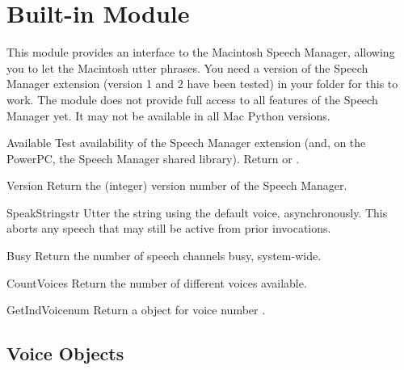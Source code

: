 \section{Built-in Module }




This module provides an interface to the Macintosh Speech Manager,
allowing you to let the Macintosh utter phrases. You need a version of
the Speech Manager extension (version 1 and 2 have been tested) in
your  folder for this to work. The module does not
provide full access to all features of the Speech Manager yet.  It may
not be available in all Mac Python versions.

\begin{funcdesc}{Available}{}
Test availability of the Speech Manager extension (and, on the
PowerPC, the Speech Manager shared library). Return  or
.
\end{funcdesc}

\begin{funcdesc}{Version}{}
Return the (integer) version number of the Speech Manager.
\end{funcdesc}

\begin{funcdesc}{SpeakString}{str}
Utter the string  using the default voice,
asynchronously. This aborts any speech that may still be active from
prior  invocations.
\end{funcdesc}

\begin{funcdesc}{Busy}{}
Return the number of speech channels busy, system-wide.
\end{funcdesc}

\begin{funcdesc}{CountVoices}{}
Return the number of different voices available.
\end{funcdesc}

\begin{funcdesc}{GetIndVoice}{num}
Return a  object for voice number .
\end{funcdesc}

\subsection{Voice Objects}
\label{voice-objects}

